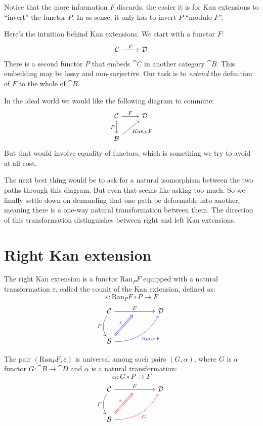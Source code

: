 \documentclass[DaoFP]{subfiles}
\begin{document}
Notice that the more information $F$ discards, the easier it is for Kan extensions to ``invert'' the functor $P$. In as sense, it only has to invert $P$ ``modulo $F$''.

Here's the intuition behind Kan extensions. We start with a functor $F$:
\[
 \begin{tikzcd} \cat C
 \arrow[r, "F"]
 & \cat D
  \end{tikzcd}
\]
There is a second functor $P$ that embeds $\cat C$ in another category $\cat B$. This embedding may be lossy and non-surjective. Our task is to \emph{extend} the definition of $F$ to the whole of $\cat B$. 

In the ideal world we would like the following diagram to commute:
\[
 \begin{tikzcd} \cat C
 \arrow[r, "F"]
 \arrow[d, "P"']
 & \cat D
 \\
 \cat B
\arrow[ur, "Kan_P F"']
  \end{tikzcd}
\]
But that would involve equality of functors, which is something we try to avoid at all cost. 

The next best thing would be to ask for a natural isomorphism between the two paths through this diagram. But even that seems like asking too much. So we finally settle down on demanding that one path be deformable into another, meaning there is a one-way natural transformation between them. The direction of this transformation distinguishes between right and left Kan extensions.

\section{Right Kan extension}

The right Kan extension is a functor $\text{Ran}_P F$ equipped with a natural transformation $\varepsilon$, called the counit of the Kan extension, defined as:
\[ \varepsilon \colon \text{Ran}_P F \circ P \to F\]
\[
 \begin{tikzcd} [row sep=1cm, column sep=1cm]
 \cat C
 \arrow[rr, "F", "" {name=ID, below} ]
 \arrow[d, bend right, "P"']
 && \cat D
 \\
 \cat B
  \arrow[urr, blue, bend right, "\text{Ran}_P F"']
 \arrow[Rightarrow, blue, "\varepsilon",  to=ID]
 \end{tikzcd}
\]

The pair $(\text{Ran}_P F, \varepsilon)$ is universal among such pairs $(G, \alpha)$, where $G$ is a functor $G \colon \cat B \to \cat D$ and $\alpha$ is a natural transformation:
\[ \alpha \colon G \circ P \to F \]
\[
 \begin{tikzcd} [row sep=1cm, column sep=1cm]
 \cat C
 \arrow[rr, "F", "" {name=ID, below} ]
 \arrow[d, bend right, "P"']
 && \cat D
 \\
 \cat B
  \arrow[urr, red, bend right, "G"']
 \arrow[Rightarrow, red, "\alpha",  to=ID]
 \end{tikzcd}
\]
\end{document}
